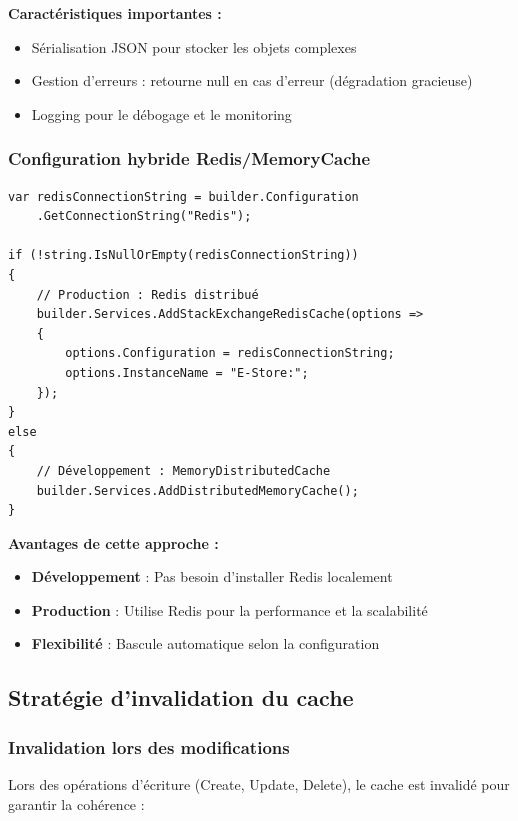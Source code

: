 \documentclass[12pt,a4paper]{article}
\begin{document}
\textbf{Caractéristiques importantes :}
\begin{itemize}
    \item Sérialisation JSON pour stocker les objets complexes
    \item Gestion d'erreurs : retourne null en cas d'erreur (dégradation gracieuse)
    \item Logging pour le débogage et le monitoring
\end{itemize}

\subsubsection{Configuration hybride Redis/MemoryCache}

\begin{lstlisting}[caption=Configuration dans Program.cs, float=h!]
var redisConnectionString = builder.Configuration
    .GetConnectionString("Redis");

if (!string.IsNullOrEmpty(redisConnectionString))
{
    // Production : Redis distribué
    builder.Services.AddStackExchangeRedisCache(options =>
    {
        options.Configuration = redisConnectionString;
        options.InstanceName = "E-Store:";
    });
}
else
{
    // Développement : MemoryDistributedCache
    builder.Services.AddDistributedMemoryCache();
}
\end{lstlisting}

\textbf{Avantages de cette approche :}
\begin{itemize}
    \item \textbf{Développement} : Pas besoin d'installer Redis localement
    \item \textbf{Production} : Utilise Redis pour la performance et la scalabilité
    \item \textbf{Flexibilité} : Bascule automatique selon la configuration
\end{itemize}

\subsection{Stratégie d'invalidation du cache}

\subsubsection{Invalidation lors des modifications}

Lors des opérations d'écriture (Create, Update, Delete), le cache est invalidé pour garantir la cohérence :
\end{document}
